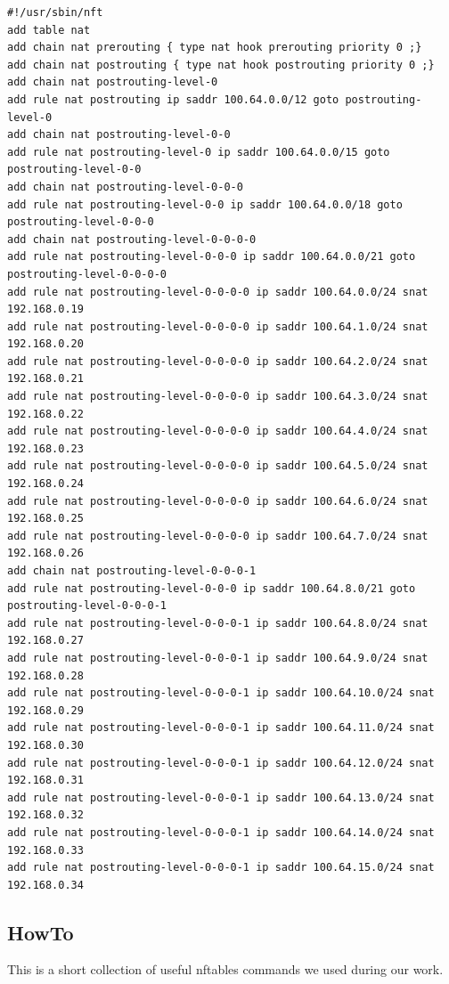\documentclass{report}
\begin{document}
\begingroup
\fontsize{9pt}{9pt}\selectfont
\begin{verbatim}
#!/usr/sbin/nft
add table nat
add chain nat prerouting { type nat hook prerouting priority 0 ;}
add chain nat postrouting { type nat hook postrouting priority 0 ;}
add chain nat postrouting-level-0
add rule nat postrouting ip saddr 100.64.0.0/12 goto postrouting-level-0
add chain nat postrouting-level-0-0
add rule nat postrouting-level-0 ip saddr 100.64.0.0/15 goto postrouting-level-0-0
add chain nat postrouting-level-0-0-0
add rule nat postrouting-level-0-0 ip saddr 100.64.0.0/18 goto postrouting-level-0-0-0
add chain nat postrouting-level-0-0-0-0
add rule nat postrouting-level-0-0-0 ip saddr 100.64.0.0/21 goto postrouting-level-0-0-0-0
add rule nat postrouting-level-0-0-0-0 ip saddr 100.64.0.0/24 snat 192.168.0.19
add rule nat postrouting-level-0-0-0-0 ip saddr 100.64.1.0/24 snat 192.168.0.20
add rule nat postrouting-level-0-0-0-0 ip saddr 100.64.2.0/24 snat 192.168.0.21
add rule nat postrouting-level-0-0-0-0 ip saddr 100.64.3.0/24 snat 192.168.0.22
add rule nat postrouting-level-0-0-0-0 ip saddr 100.64.4.0/24 snat 192.168.0.23
add rule nat postrouting-level-0-0-0-0 ip saddr 100.64.5.0/24 snat 192.168.0.24
add rule nat postrouting-level-0-0-0-0 ip saddr 100.64.6.0/24 snat 192.168.0.25
add rule nat postrouting-level-0-0-0-0 ip saddr 100.64.7.0/24 snat 192.168.0.26
add chain nat postrouting-level-0-0-0-1
add rule nat postrouting-level-0-0-0 ip saddr 100.64.8.0/21 goto postrouting-level-0-0-0-1
add rule nat postrouting-level-0-0-0-1 ip saddr 100.64.8.0/24 snat 192.168.0.27
add rule nat postrouting-level-0-0-0-1 ip saddr 100.64.9.0/24 snat 192.168.0.28
add rule nat postrouting-level-0-0-0-1 ip saddr 100.64.10.0/24 snat 192.168.0.29
add rule nat postrouting-level-0-0-0-1 ip saddr 100.64.11.0/24 snat 192.168.0.30
add rule nat postrouting-level-0-0-0-1 ip saddr 100.64.12.0/24 snat 192.168.0.31
add rule nat postrouting-level-0-0-0-1 ip saddr 100.64.13.0/24 snat 192.168.0.32
add rule nat postrouting-level-0-0-0-1 ip saddr 100.64.14.0/24 snat 192.168.0.33
add rule nat postrouting-level-0-0-0-1 ip saddr 100.64.15.0/24 snat 192.168.0.34
\end{verbatim}
\endgroup

\subsection{HowTo} 

This is a short collection of useful nftables commands we used during
our work.
\end{document}
